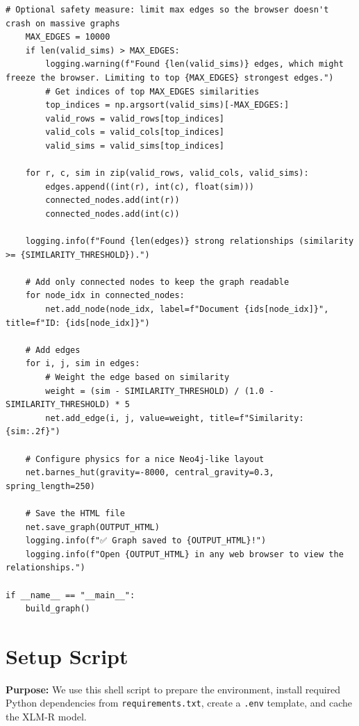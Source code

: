 \documentclass[11pt]{article}
\begin{document}
\begin{lstlisting}[style=pythoncode, caption={visualize\_vector\_relationships.py}]
    # Optional safety measure: limit max edges so the browser doesn't crash on massive graphs
    MAX_EDGES = 10000
    if len(valid_sims) > MAX_EDGES:
        logging.warning(f"Found {len(valid_sims)} edges, which might freeze the browser. Limiting to top {MAX_EDGES} strongest edges.")
        # Get indices of top MAX_EDGES similarities
        top_indices = np.argsort(valid_sims)[-MAX_EDGES:]
        valid_rows = valid_rows[top_indices]
        valid_cols = valid_cols[top_indices]
        valid_sims = valid_sims[top_indices]

    for r, c, sim in zip(valid_rows, valid_cols, valid_sims):
        edges.append((int(r), int(c), float(sim)))
        connected_nodes.add(int(r))
        connected_nodes.add(int(c))
                
    logging.info(f"Found {len(edges)} strong relationships (similarity >= {SIMILARITY_THRESHOLD}).")
    
    # Add only connected nodes to keep the graph readable
    for node_idx in connected_nodes:
        net.add_node(node_idx, label=f"Document {ids[node_idx]}", title=f"ID: {ids[node_idx]}")
        
    # Add edges
    for i, j, sim in edges:
        # Weight the edge based on similarity
        weight = (sim - SIMILARITY_THRESHOLD) / (1.0 - SIMILARITY_THRESHOLD) * 5
        net.add_edge(i, j, value=weight, title=f"Similarity: {sim:.2f}")

    # Configure physics for a nice Neo4j-like layout
    net.barnes_hut(gravity=-8000, central_gravity=0.3, spring_length=250)
    
    # Save the HTML file
    net.save_graph(OUTPUT_HTML)
    logging.info(f"✅ Graph saved to {OUTPUT_HTML}!")
    logging.info(f"Open {OUTPUT_HTML} in any web browser to view the relationships.")

if __name__ == "__main__":
    build_graph()
\end{lstlisting}


\section{Setup Script} \label{sec:setup}
\textbf{Purpose:} We use this shell script to prepare the environment, install required Python dependencies from \texttt{requirements.txt}, create a \texttt{.env} template, and cache the XLM-R model.
\end{document}
